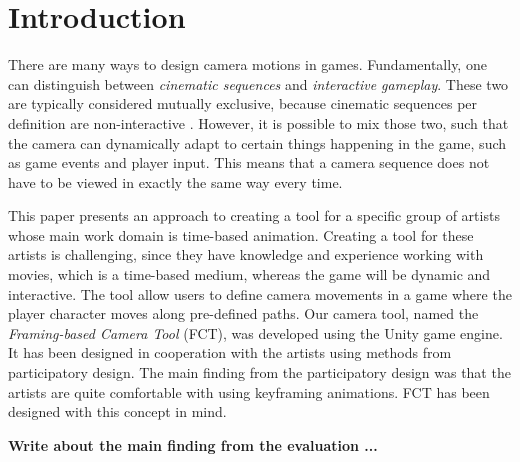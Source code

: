 \section{Introduction}


There are many ways to design camera motions in games. Fundamentally, one can distinguish between \textit{cinematic sequences} and \textit{interactive gameplay}. These two are typically considered mutually exclusive, because cinematic sequences per definition are non-interactive \cite{haigh-hutchinson_real-time_2009}. However, it is possible to mix those two, such that the camera can dynamically adapt to certain things happening in the game, such as game events and player input. This means that a camera sequence does not have to be viewed in exactly the same way every time.

This paper presents an approach to creating a tool for a specific group of artists whose main work domain is time-based animation. Creating a tool for these artists is challenging, since they have knowledge and experience working with movies, which is a time-based medium, whereas the game will be dynamic and interactive.  The tool allow users to define camera movements in a game where the player character moves along pre-defined paths. Our camera tool, named the \textit{Framing-based Camera Tool} (FCT), was developed using the Unity game engine. It has been designed in cooperation with the artists using methods from participatory design. The main finding from the participatory design was that the artists are quite comfortable with using keyframing animations. FCT has been designed with this concept in mind.

\textbf{Write about the main finding from the evaluation ...}


